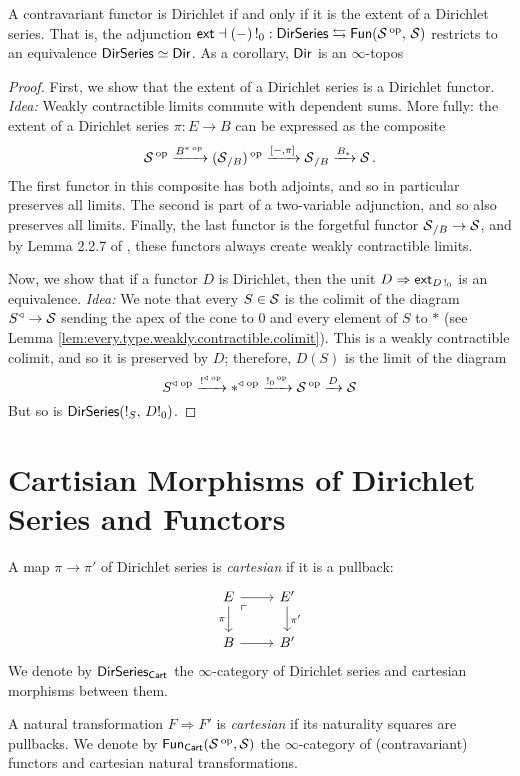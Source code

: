 \begin{thm}\label{thm:dirichlet.series.functors.equivalence}
  A contravariant functor is Dirichlet if and only if it is the extent of a
  Dirichlet series. That is, the adjunction $\mathsf{{ext}} \dashv (-)\operatorname{!}_0 : \operatorname{\mathsf{{DirSeries}}} \leftrightarrows
  \operatorname{\mathsf{{Fun}}}(\operatorname{\mathcal{S}}\operatorname{^\text{op}},\, \operatorname{\mathcal{S}})$ restricts to an equivalence $\operatorname{\mathsf{{DirSeries}}} \simeq \operatorname{\mathsf{{Dir}}}$. As
  a corollary, $\operatorname{\mathsf{{Dir}}}$ is an $\infty$-topos
\end{thm}
\begin{proof}
  First, we show that the extent of a Dirichlet series is a Dirichlet functor.
  \emph{Idea:} Weakly contractible limits commute with dependent sums. More
  fully: the extent of a Dirichlet series $\pi : E \to B$ can be expressed as
  the composite
  $$\operatorname{\mathcal{S}}\operatorname{^\text{op}} \xrightarrow{B^{\ast}\operatorname{^\text{op}}} (\operatorname{\mathcal{S}}_{/B})\operatorname{^\text{op}} \xrightarrow{[-,\pi]} \operatorname{\mathcal{S}}_{/B} \xrightarrow{B_{\ast}}
  \operatorname{\mathcal{S}}.$$
  The first functor in this composite has both adjoints, and so in particular
  preserves all limits. The second is part of a two-variable adjunction, and so
  also preserves all limits. Finally, the last functor is the forgetful functor
  $\operatorname{\mathcal{S}}_{/B} \to \operatorname{\mathcal{S}}$, and by Lemma 2.2.7 of \cite{GHK:Analytic.Monads}, these
  functors always create weakly contractible limits.

  Now, we show that if a functor $D$ is Dirichlet, then the unit $D \Rightarrow
  \mathsf{{ext}}_{D\operatorname{!}_0}$ is an equivalence.
  \emph{Idea:} We note that every $S \in \operatorname{\mathcal{S}}$ is the colimit of the diagram
  $S^{\triangleleft} \to \operatorname{\mathcal{S}}$ sending the apex of the cone to $0$ and every
  element of $S$ to $\ast$ (see Lemma
  \ref{lem:every.type.weakly.contractible.colimit}). This is a weakly
  contractible colimit, and so it is preserved by $D$; therefore, $D(S)$ is the
  limit of the diagram
  $$S^{\triangleleft}\operatorname{^\text{op}} \xrightarrow{\operatorname{!}^{\triangleleft}\operatorname{^\text{op}}}
  \ast^{\triangleleft}\operatorname{^\text{op}} \xrightarrow{\operatorname{!}_0\operatorname{^\text{op}}} \operatorname{\mathcal{S}}\operatorname{^\text{op}} \xrightarrow{D} \operatorname{\mathcal{S}}$$
  But so is $\operatorname{\mathsf{{DirSeries}}}(!_S,\, D!_0)$.
\end{proof}

\section{Cartisian Morphisms of Dirichlet Series and Functors}

\begin{defn}
A map $\pi \to \pi'$ of Dirichlet series is \emph{cartesian} if it
is a pullback:
\[
  \begin{tikzcd}
    E \arrow[d, "\pi"'] \arrow[r] \arrow[dr, phantom, "\ulcorner" very near
    start] & E' \arrow[d, "\pi'"] \\
    B \arrow[r] & B'
  \end{tikzcd}
\]
We denote by $\operatorname{\mathsf{{DirSeries}}}_{\mathsf{{Cart}}}$ the $\infty$-category of Dirichlet
series and cartesian morphisms between them.

A natural transformation $F \Rightarrow F'$ is \emph{cartesian} if its
naturality squares are pullbacks. We denote by $\operatorname{\mathsf{{Fun}}}_{\mathsf{{Cart}}}(\operatorname{\mathcal{S}}\operatorname{^\text{op}}, \operatorname{\mathcal{S}})$
the $\infty$-category of (contravariant) functors and cartesian natural transformations.
\end{defn}

